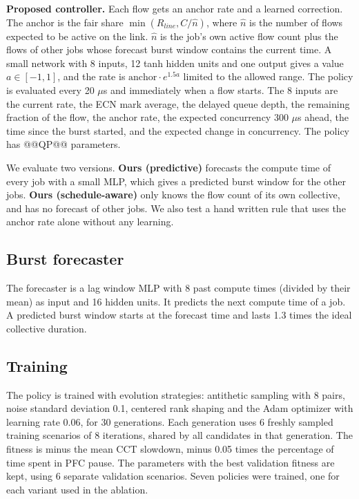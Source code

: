 \documentclass[conference]{IEEEtran}
\begin{document}
\textbf{Proposed controller.} Each flow gets an anchor rate and a learned correction. The anchor is the fair share $\min(R_{line}, C/\hat n)$, where $\hat n$ is the number of flows expected to be active on the link. $\hat n$ is the job's own active flow count plus the flows of other jobs whose forecast burst window contains the current time. A small network with 8 inputs, 12 tanh hidden units and one output gives a value $a\in[-1,1]$, and the rate is $\text{anchor}\cdot e^{1.5a}$ limited to the allowed range. The policy is evaluated every 20 $\mu$s and immediately when a flow starts. The 8 inputs are the current rate, the ECN mark average, the delayed queue depth, the remaining fraction of the flow, the anchor rate, the expected concurrency 300 $\mu$s ahead, the time since the burst started, and the expected change in concurrency. The policy has @@QP@@ parameters.

We evaluate two versions. \textbf{Ours (predictive)} forecasts the compute time of every job with a small MLP, which gives a predicted burst window for the other jobs. \textbf{Ours (schedule-aware)} only knows the flow count of its own collective, and has no forecast of other jobs. We also test a hand written rule that uses the anchor rate alone without any learning.

\subsection{Burst forecaster}
The forecaster is a lag window MLP with 8 past compute times (divided by their mean) as input and 16 hidden units. It predicts the next compute time of a job. A predicted burst window starts at the forecast time and lasts 1.3 times the ideal collective duration.

\subsection{Training}
The policy is trained with evolution strategies: antithetic sampling with 8 pairs, noise standard deviation 0.1, centered rank shaping and the Adam optimizer with learning rate 0.06, for 30 generations. Each generation uses 6 freshly sampled training scenarios of 8 iterations, shared by all candidates in that generation. The fitness is minus the mean CCT slowdown, minus 0.05 times the percentage of time spent in PFC pause. The parameters with the best validation fitness are kept, using 6 separate validation scenarios. Seven policies were trained, one for each variant used in the ablation.
\end{document}
